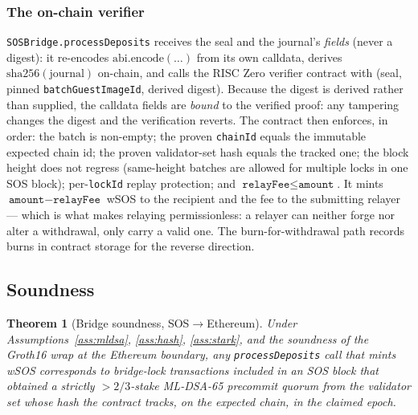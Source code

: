 \documentclass[11pt]{article}
\newcommand{\code}[1]{\texttt{#1}}
\newcommand{\mldsa}{ML\mbox{-}DSA\mbox{-}65}
\theoremstyle{plain}
\newtheorem{theorem}{Theorem}[section]
\theoremstyle{definition}
\theoremstyle{remark}
\begin{document}
\subsubsection{The on-chain verifier}
\label{sec:contract}

\code{SOSBridge.processDeposits} receives the seal and the journal's
\emph{fields} (never a digest): it re-encodes
$\mathrm{abi.encode}(\ldots)$ from its own calldata, derives
$\mathrm{sha256}(\mathrm{journal})$ on-chain, and calls the RISC Zero
verifier contract with (seal, pinned \code{batchGuestImageId}, derived
digest). Because the digest is derived rather than supplied, the calldata
fields are \emph{bound} to the verified proof: any tampering changes the
digest and the verification reverts. The contract then enforces, in order:
the batch is non-empty; the proven \code{chainId} equals the immutable
expected chain id; the proven validator-set hash equals the tracked one; the
block height does not regress (same-height batches are allowed for multiple
locks in one SOS block); per-\code{lockId} replay protection; and
$\code{relayFee} \le \code{amount}$. It mints
$\code{amount} - \code{relayFee}$ wSOS to the recipient and the fee to the
submitting relayer --- which is what makes relaying permissionless: a relayer
can neither forge nor alter a withdrawal, only carry a valid one. The
burn-for-withdrawal path records burns in contract storage for the reverse
direction.

\subsection{Soundness}
\label{sec:bridge-soundness}

\begin{theorem}[Bridge soundness, SOS$\to$Ethereum]
\label{thm:bridge}
Under Assumptions~\ref{ass:mldsa}, \ref{ass:hash}, \ref{ass:stark}, and the
soundness of the Groth16 wrap at the Ethereum boundary, any
\code{processDeposits} call that mints wSOS corresponds to bridge-lock
transactions included in an SOS block that obtained a strictly
$>\!2/3$-stake \mldsa{} precommit quorum from the validator set whose hash
the contract tracks, on the expected chain, in the claimed epoch.
\end{theorem}
\end{document}

